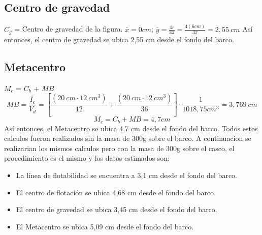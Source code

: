 \documentclass[letterpaper]{article}
\begin{document}
\subsection{Centro de gravedad}
$C_{g}$ = Centro de gravedad de la figura.
\newline
$\bar{x}=0 cm$;
\newline 
$\bar{y}= \frac{4r}{3\pi} = \frac{4(6cm)}{3\pi} = 2,55~cm$
Así entonces, el centro de gravedad se ubica 2,55 cm desde el fondo del barco.
\subsection{Metacentro}
$M_{c}$ = $C_{b}$ + $MB$
\newline
\begin{equation}
	MB=\frac{I_{c}}{V_{d}} = [\frac{(20~cm \cdot 12~cm^3)}{12} + \frac{(20~cm \cdot 12~cm^3)}{36}] \cdot \frac{1}{1018,75cm^3} = 3,769~cm
\end{equation}
\begin{equation}
	M_{c} = C_{b} + MB = 4,7cm
\end{equation}
\newline
Así entonces, el Metacentro se ubica 4,7 cm desde el fondo del barco.
\newline
Todos estos calculos fueron realizados sin la masa de 300g sobre el barco.
A continuacion se realizarian los mismos calculos pero con la masa de 300g sobre el casco, el procedimiento es el mismo y los datos estimados son:
\newline
\begin{itemize}
	\item La línea de flotabilidad se encuentra a  3,1 cm desde el fondo del barco.
	\item El centro de flotación se ubica 4,68 cm desde el fondo del barco.
	\item El centro de gravedad se ubica 3,45 cm desde el fondo del barco.
	\item El Metacentro se ubica 5,09 cm desde el fondo del barco.
\end{itemize}
		
\end{document}
